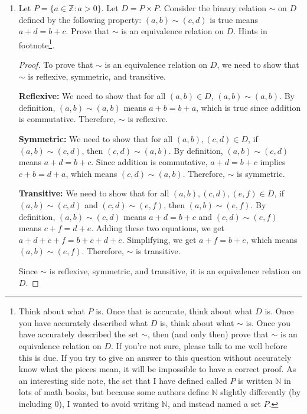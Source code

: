 \documentclass{article}
\newcommand\Z{\mathbb{Z}}
\begin{document}
\begin{enumerate}

\item Let $P = \{a \in \Z : a > 0\}$. Let $D = P \times P$. Consider the binary relation $\sim$ on $D$ defined by the following property: $(a,b) \sim (c,d)$ is true means $a+d=b+c$. Prove that $\sim$ is an equivalence relation on $D$. Hints in footnote\footnote{Think about what $P$ is. Once that is accurate, think about what $D$ is. Once you have accurately described what $D$ is, think about what $\sim$ is. Once you have accurately described the set $\sim$, then (and only then) prove that $\sim$ is an equivalence relation on $D$. If you're not sure, please talk to me well before this is due. If you try to give an answer to this question without accurately know what the pieces mean, it will be impossible to have a correct proof. As an interesting side note, the set that I have defined called $P$ is written $\mathbb{N}$ in lots of math books, but because some authors define $\mathbb{N}$ slightly differently (by including $0$), I wanted to avoid writing $\mathbb{N}$, and instead named a set $P$.}.

\begin{proof}
    To prove that $\sim$ is an equivalence relation on $D$, we need to show that $\sim$ is reflexive, symmetric, and transitive.

    \textbf{Reflexive:} We need to show that for all $(a,b) \in D$, $(a,b) \sim (a,b)$. By definition, $(a,b) \sim (a,b)$ means $a+b = b+a$, which is true since addition is commutative. Therefore, $\sim$ is reflexive.

    \textbf{Symmetric:} We need to show that for all $(a,b), (c,d) \in D$, if $(a,b) \sim (c,d)$, then $(c,d) \sim (a,b)$. By definition, $(a,b) \sim (c,d)$ means $a+d = b+c$. Since addition is commutative, $a+d = b+c$ implies $c+b = d+a$, which means $(c,d) \sim (a,b)$. Therefore, $\sim$ is symmetric.

    \textbf{Transitive:} We need to show that for all $(a,b), (c,d), (e,f) \in D$, if $(a,b) \sim (c,d)$ and $(c,d) \sim (e,f)$, then $(a,b) \sim (e,f)$. By definition, $(a,b) \sim (c,d)$ means $a+d = b+c$ and $(c,d) \sim (e,f)$ means $c+f = d+e$. Adding these two equations, we get $a+d + c+f = b+c + d+e$. Simplifying, we get $a+f = b+e$, which means $(a,b) \sim (e,f)$. Therefore, $\sim$ is transitive.

    Since $\sim$ is reflexive, symmetric, and transitive, it is an equivalence relation on $D$.
\end{proof}


\end{enumerate}
\end{document}
